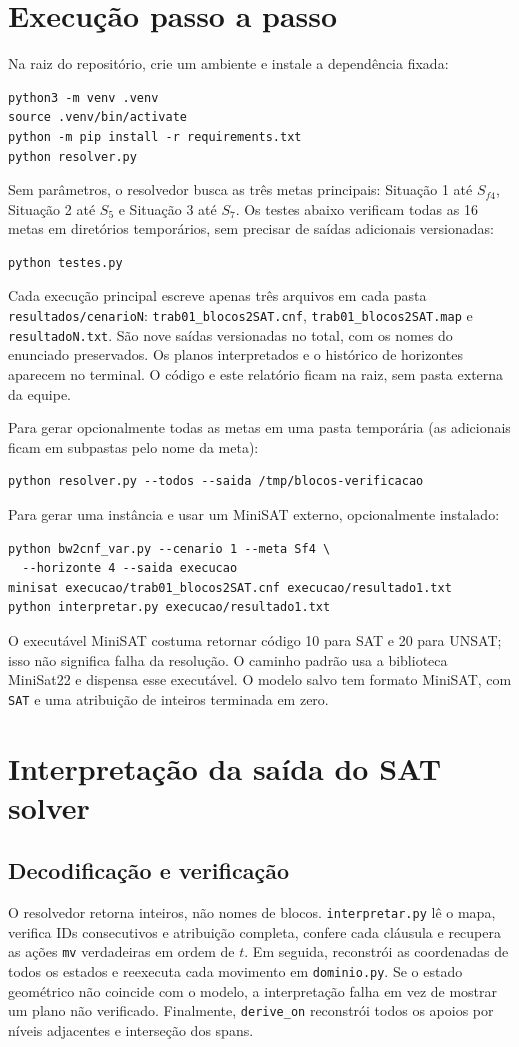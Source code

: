 \documentclass[11pt,a4paper]{article}
\begin{document}
\section{Execução passo a passo}
Na raiz do repositório, crie um ambiente e instale a dependência fixada:
\begin{lstlisting}
python3 -m venv .venv
source .venv/bin/activate
python -m pip install -r requirements.txt
python resolver.py
\end{lstlisting}
Sem parâmetros, o resolvedor busca as três metas principais: Situação 1 até $S_{f4}$, Situação 2 até $S_5$ e Situação 3 até $S_7$. Os testes abaixo verificam todas as 16 metas em diretórios temporários, sem precisar de saídas adicionais versionadas:
\begin{lstlisting}
python testes.py
\end{lstlisting}
Cada execução principal escreve apenas três arquivos em cada pasta \texttt{resultados/cenarioN}: \texttt{trab01\_blocos2SAT.cnf}, \texttt{trab01\_blocos2SAT.map} e \texttt{resultadoN.txt}. São nove saídas versionadas no total, com os nomes do enunciado preservados. Os planos interpretados e o histórico de horizontes aparecem no terminal. O código e este relatório ficam na raiz, sem pasta externa da equipe.

Para gerar opcionalmente todas as metas em uma pasta temporária (as adicionais ficam em subpastas pelo nome da meta):
\begin{lstlisting}
python resolver.py --todos --saida /tmp/blocos-verificacao
\end{lstlisting}
Para gerar uma instância e usar um MiniSAT externo, opcionalmente instalado:
\begin{lstlisting}
python bw2cnf_var.py --cenario 1 --meta Sf4 \
  --horizonte 4 --saida execucao
minisat execucao/trab01_blocos2SAT.cnf execucao/resultado1.txt
python interpretar.py execucao/resultado1.txt
\end{lstlisting}
O executável MiniSAT costuma retornar código 10 para SAT e 20 para UNSAT; isso não significa falha da resolução. O caminho padrão usa a biblioteca MiniSat22 e dispensa esse executável. O modelo salvo tem formato MiniSAT, com \texttt{SAT} e uma atribuição de inteiros terminada em zero.

\section{Interpretação da saída do SAT solver}
\subsection{Decodificação e verificação}
O resolvedor retorna inteiros, não nomes de blocos. \texttt{interpretar.py} lê o mapa, verifica IDs consecutivos e atribuição completa, confere cada cláusula e recupera as ações \texttt{mv} verdadeiras em ordem de $t$. Em seguida, reconstrói as coordenadas de todos os estados e reexecuta cada movimento em \texttt{dominio.py}. Se o estado geométrico não coincide com o modelo, a interpretação falha em vez de mostrar um plano não verificado. Finalmente, \texttt{derive\_on} reconstrói todos os apoios por níveis adjacentes e interseção dos spans.
\end{document}
